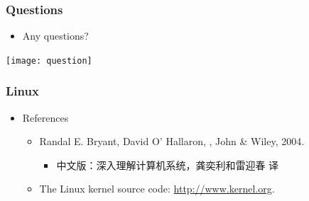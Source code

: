 \documentclass[CJKutf8,xcolor=pdftex,dvipsnames,table]{beamer}
\begin{document}
\begin{CJK*}{UTF8}{song}
\begin{frame}[fragile]
\fi

\end{frame}
  

  
  \begin{frame}
    \frametitle{Questions}
    \begin{itemize}
    \item{Any questions?}
    \end{itemize}
    \begin{center}
      \texttt{[image: question]}
    \end{center}
  \end{frame}
  
  \begin{frame}
    \frametitle{Linux} \pause
    \begin{itemize}
    \item{References} \pause
      \begin{itemize}
      \item{Randal E. Bryant, David O' Hallaron, , John \& Wiley, 2004.} \pause
        \begin{itemize}
        \item{中文版：深入理解计算机系统，龚奕利和雷迎春 译} \pause
        \end{itemize}
      \item{The Linux kernel source code: \url{http://www.kernel.org}.}
      \end{itemize}
    \end{itemize}
  \end{frame}


\end{CJK*}
\end{document}
